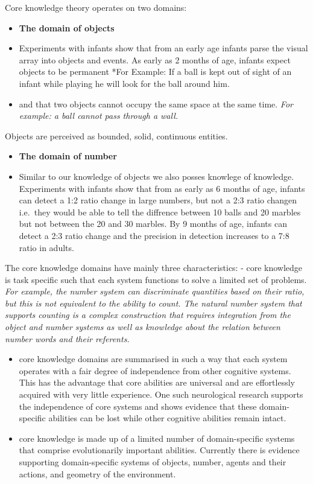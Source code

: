 \documentclass[11pt]{article}
\providecommand{\tightlist}{%
      \setlength{\itemsep}{0pt}\setlength{\parskip}{0pt}}
\begin{document}
Core knowledge theory operates on two domains:

\begin{itemize}
\item
  \textbf{The domain of objects}
\item
  Experiments with infants show that from an early age infants parse the
  visual array into objects and events. As early as 2 months of age,
  infants expect objects to be permanent *For Example: If a ball is kept
  out of sight of an infant while playing he will look for the ball
  around him.
\item
  and that two objects cannot occupy the same space at the same time.
  \emph{For example: a ball cannot pass through a wall.}
\end{itemize}

Objects are perceived as bounded, solid, continuous entities.

\begin{itemize}
\tightlist
\item
  \textbf{The domain of number}
\item
  Similar to our knowledge of objects we also posses knowlege of
  knowledge. Experiments with infants show that from as early as 6
  months of age, infants can detect a 1:2 ratio change in large numbers,
  but not a 2:3 ratio changen i.e.~they would be able to tell the
  diffrence between 10 balls and 20 marbles but not between the 20 and
  30 marbles. By 9 months of age, infants can detect a 2:3 ratio change
  and the precision in detection increases to a 7:8 ratio in adults.
\end{itemize}

    The core knowledge domains have mainly three characteristics: - core
knowledge is task specific such that each system functions to solve a
limited set of problems. \emph{For example, the number system can
discriminate quantities based on their ratio, but this is not equivalent
to the ability to count. The natural number system that supports
counting is a complex construction that requires integration from the
object and number systems as well as knowledge about the relation
between number words and their referents.}

\begin{itemize}
\item
  core knowledge domains are summarised in such a way that each system
  operates with a fair degree of independence from other cognitive
  systems. This has the advantage that core abilities are universal and
  are effortlessly acquired with very little experience. One such
  neurological research supports the independence of core systems and
  shows evidence that these domain-specific abilities can be lost while
  other cognitive abilities remain intact.
\item
  core knowledge is made up of a limited number of domain-specific
  systems that comprise evolutionarily important abilities. Currently
  there is evidence supporting domain-specific systems of objects,
  number, agents and their actions, and geometry of the environment.
\end{itemize}
\end{document}
